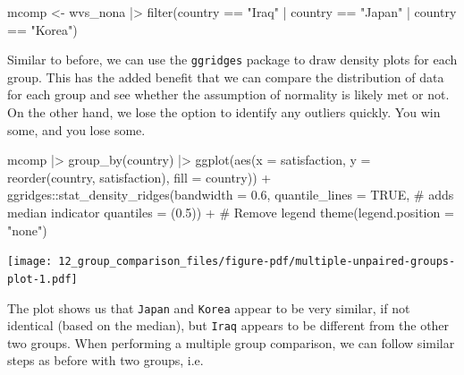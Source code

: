 \documentclass[
  letterpaper,
]{krantz}
\makeatletter
\newenvironment{Shaded}{\begin{snugshade}}{\end{snugshade}}
\newcommand{\AttributeTok}[1]{\textcolor[rgb]{0.40,0.45,0.13}{#1}}
\newcommand{\CommentTok}[1]{\textcolor[rgb]{0.37,0.37,0.37}{#1}}
\newcommand{\ConstantTok}[1]{\textcolor[rgb]{0.56,0.35,0.01}{#1}}
\newcommand{\FloatTok}[1]{\textcolor[rgb]{0.68,0.00,0.00}{#1}}
\newcommand{\FunctionTok}[1]{\textcolor[rgb]{0.28,0.35,0.67}{#1}}
\newcommand{\NormalTok}[1]{\textcolor[rgb]{0.00,0.23,0.31}{#1}}
\newcommand{\OtherTok}[1]{\textcolor[rgb]{0.00,0.23,0.31}{#1}}
\newcommand{\SpecialCharTok}[1]{\textcolor[rgb]{0.37,0.37,0.37}{#1}}
\newcommand{\StringTok}[1]{\textcolor[rgb]{0.13,0.47,0.30}{#1}}
\newenvironment{kframe}{%
\medskip{}
\setlength{\fboxsep}{.8em}
 \def\at@end@of@kframe{}%
 \ifinner\ifhmode%
  \def\at@end@of@kframe{\end{minipage}}%
  \begin{minipage}{\columnwidth}%
 \fi\fi%
 \def\FrameCommand##1{\hskip\@totalleftmargin \hskip-\fboxsep
 \colorbox{shadecolor}{##1}\hskip-\fboxsep
     \hskip-\linewidth \hskip-\@totalleftmargin \hskip\columnwidth}%
 \MakeFramed {\advance\hsize-\width
   \@totalleftmargin\z@ \linewidth\hsize
   \@setminipage}}%
 {\par\unskip\endMakeFramed%
 \at@end@of@kframe}
\renewenvironment{Shaded}{\begin{kframe}}{\end{kframe}}
\makeatother
\begin{document}
\begin{Shaded}
\begin{Highlighting}[]
\NormalTok{mcomp }\OtherTok{\textless{}{-}}
\NormalTok{  wvs\_nona }\SpecialCharTok{|\textgreater{}}
  \FunctionTok{filter}\NormalTok{(country }\SpecialCharTok{==} \StringTok{"Iraq"} \SpecialCharTok{|}
\NormalTok{           country }\SpecialCharTok{==} \StringTok{"Japan"} \SpecialCharTok{|}
\NormalTok{           country }\SpecialCharTok{==} \StringTok{"Korea"}\NormalTok{)}
\end{Highlighting}
\end{Shaded}

Similar to before, we can use the \texttt{ggridges} package to draw
density plots for each group. This has the added benefit that we can
compare the distribution of data for each group and see whether the
assumption of normality is likely met or not. On the other hand, we lose
the option to identify any outliers quickly. You win some, and you lose
some.

\begin{Shaded}
\begin{Highlighting}[]
\NormalTok{mcomp }\SpecialCharTok{|\textgreater{}}
  \FunctionTok{group\_by}\NormalTok{(country) }\SpecialCharTok{|\textgreater{}}
  \FunctionTok{ggplot}\NormalTok{(}\FunctionTok{aes}\NormalTok{(}\AttributeTok{x =}\NormalTok{ satisfaction,}
             \AttributeTok{y =} \FunctionTok{reorder}\NormalTok{(country, satisfaction),}
             \AttributeTok{fill =}\NormalTok{ country)) }\SpecialCharTok{+}
\NormalTok{  ggridges}\SpecialCharTok{::}\FunctionTok{stat\_density\_ridges}\NormalTok{(}\AttributeTok{bandwidth =} \FloatTok{0.6}\NormalTok{,}
                                \AttributeTok{quantile\_lines =} \ConstantTok{TRUE}\NormalTok{,   }\CommentTok{\# adds median indicator}
                                \AttributeTok{quantiles =}\NormalTok{ (}\FloatTok{0.5}\NormalTok{)) }\SpecialCharTok{+}
  \CommentTok{\# Remove legend}
  \FunctionTok{theme}\NormalTok{(}\AttributeTok{legend.position =} \StringTok{"none"}\NormalTok{)}
\end{Highlighting}
\end{Shaded}

\texttt{[image: 12\_group\_comparison\_files/figure-pdf/multiple-unpaired-groups-plot-1.pdf]}

The plot shows us that \texttt{Japan} and \texttt{Korea} appear to be
very similar, if not identical (based on the median), but \texttt{Iraq}
appears to be different from the other two groups. When performing a
multiple group comparison, we can follow similar steps as before with
two groups, i.e.
\end{document}
